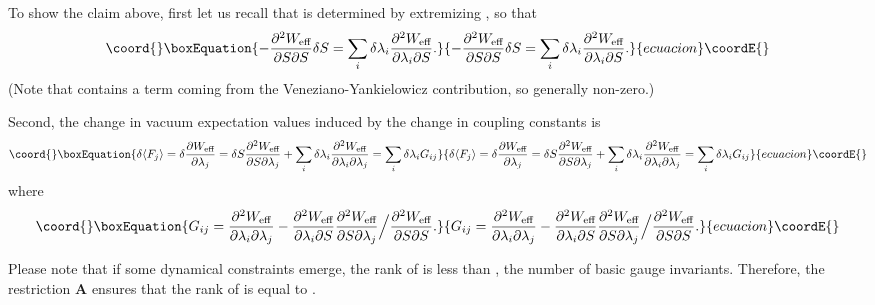 \documentclass[a4paper,12pt]{article}
\def\ex#1{\langle#1\rangle}
\def\W#1{W_{\text{#1}}}
\begin{document}
To show the claim above, first let us recall
that \coordHE{} is determined by extremizing \myHighlight{$\W{eff}$}\coordHE{},
so that\begin{equation}\coord{}\boxEquation{
-\frac{\partial^2\W{eff}}{\partial S\partial S}\delta S
=\sum_i \delta\lambda_i\frac{\partial^2\W{eff}}{\partial\lambda_i\partial S}.
}{
-\frac{\partial^2\W{eff}}{\partial S\partial S}\delta S
=\sum_i \delta\lambda_i\frac{\partial^2\W{eff}}{\partial\lambda_i\partial S}.
}{ecuacion}\coordE{}\end{equation}(Note that \myHighlight{$-{\partial^2\W{eff}}/\partial S^2$}\coordHE{} contains a term \coordHE{}
coming from the Veneziano-Yankielowicz contribution, so generally non-zero.)

Second, the change in vacuum expectation values induced by the change in coupling constants is
\begin{equation}\coord{}\boxEquation{
\delta\ex{F_j}=\delta\frac{\partial\W{eff}}{\partial\lambda_j}
=\delta S\frac{\partial^2\W{eff}}{\partial S\partial\lambda_j}+
\sum_i\delta \lambda_i
\frac{\partial^2\W{eff}}{\partial\lambda_i\partial\lambda_j}
=\sum_i\delta \lambda_i G_{ij}
}{
\delta\ex{F_j}=\delta\frac{\partial\W{eff}}{\partial\lambda_j}
=\delta S\frac{\partial^2\W{eff}}{\partial S\partial\lambda_j}+
\sum_i\delta \lambda_i
\frac{\partial^2\W{eff}}{\partial\lambda_i\partial\lambda_j}
=\sum_i\delta \lambda_i G_{ij}
}{ecuacion}\coordE{}\end{equation}where\begin{equation}\coord{}\boxEquation{
G_{ij}=
\frac{\partial^2\W{eff}}{\partial\lambda_i\partial\lambda_j}
-\frac{\partial^2\W{eff}}{\partial\lambda_i\partial S}
\frac{\partial^2\W{eff}}{\partial S\partial\lambda_j}\Big/
\frac{\partial^2\W{eff}}{\partial S\partial S}.
}{
G_{ij}=
\frac{\partial^2\W{eff}}{\partial\lambda_i\partial\lambda_j}
-\frac{\partial^2\W{eff}}{\partial\lambda_i\partial S}
\frac{\partial^2\W{eff}}{\partial S\partial\lambda_j}\Big/
\frac{\partial^2\W{eff}}{\partial S\partial S}.
}{ecuacion}\coordE{}\end{equation}

Please note that if some dynamical constraints emerge,
the rank of \coordHE{} is less than \coordHE{}, the number of basic
gauge invariants.
Therefore, the restriction \textbf{A}
ensures that the rank of \coordHE{} is equal to \coordHE{}.
\end{document}
